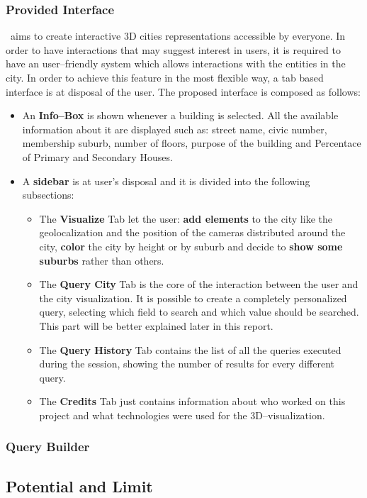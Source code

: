 \subsubsection{Provided Interface}
\applicationName\ aims to create interactive 3D cities representations accessible by everyone. In order to have interactions that may suggest interest in users, it is required to have an user--friendly system which allows interactions with the entities in the city. In order to achieve this feature in the most flexible way, a tab based interface is at disposal of the user. The proposed interface is composed as follows:
\begin{itemize}
	\item An {\bf Info--Box} is shown whenever a building is selected. All the available information about it are displayed such as: street name, civic number, membership suburb, number of floors, purpose of the building and Percentace of Primary and Secondary Houses.
	\item A {\bf sidebar} is at user's disposal and it is divided into the following subsections:
	\begin{itemize}
		\item The {\bf Visualize} Tab let the user: {\bf add elements} to the city like the geolocalization and the position of the cameras distributed around the city, {\bf color} the city by height or by suburb and decide to {\bf show some suburbs} rather than others.
		\item The {\bf Query City} Tab is the core of the interaction between the user and the city visualization. It is possible to create a completely personalized query, selecting which field to search and which value should be searched. This part will be better explained later in this report.
		\item The {\bf Query History} Tab contains the list of all the queries executed during the session, showing the number of results for every different query.
		\item The {\bf Credits} Tab just contains information about who worked on this project and what technologies were used for the 3D--visualization.
	\end{itemize}
\end{itemize}
\subsubsection{Query Builder}
\subsection{Potential and Limit}